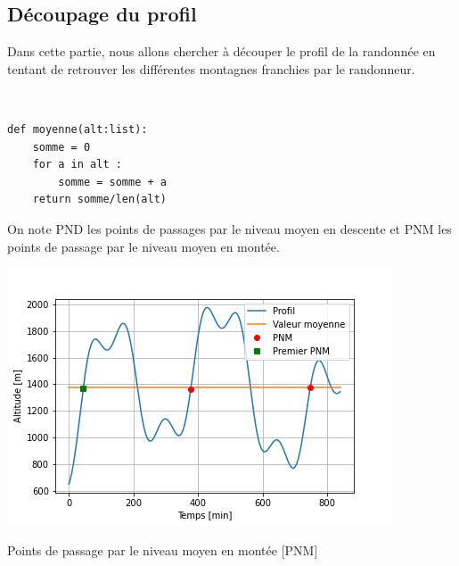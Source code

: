 


\subsection*{Découpage du profil}

\ifprof
\else
Dans cette partie, nous allons chercher à découper le profil de la randonnée en tentant de retrouver les différentes montagnes franchies par le randonneur.
\fi

\ifprof
\begin{corrige}~\\
\vspace{-.5cm}
\begin{lstlisting}
def moyenne(alt:list):
    somme = 0
    for a in alt : 
        somme = somme + a
    return somme/len(alt)
\end{lstlisting}
\end{corrige}
\else
\fi




\ifprof
\else
\fi

On note PND les points de passages par le niveau moyen en descente et PNM les points de passage par le niveau moyen en montée. 

\begin{marginfigure}
\includegraphics[width=\linewidth]{fig_03}
\caption{Points de passage par le niveau moyen en montée [PNM]}
\end{marginfigure}


